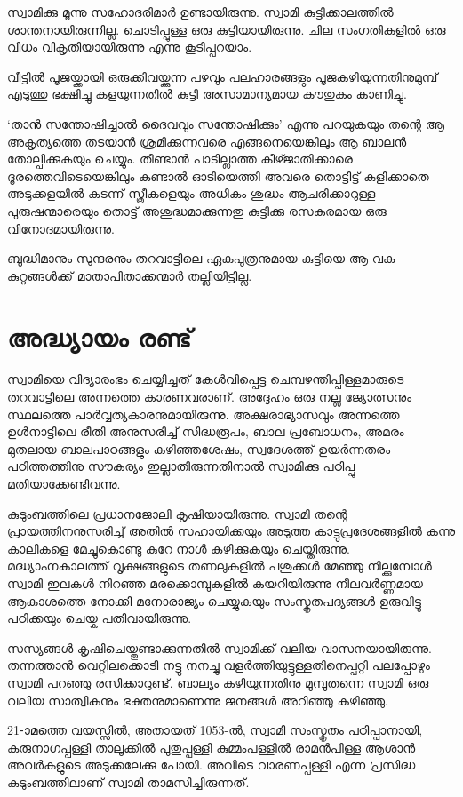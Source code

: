 \documentclass[12pt,openany]{book}
\begin{document}
	സ്വാമിക്കു മൂന്നു സഹോദരിമാർ ഉണ്ടായിരുന്നു. സ്വാമി കുട്ടിക്കാലത്തിൽ ശാന്തനായിരുന്നില്ല. ചൊടിപ്പുള്ള ഒരു കുട്ടിയായിരുന്നു. ചില സംഗതികളിൽ ഒരു വിധം വികൃതിയായിരുന്നു എന്നു കൂടിപ്പറയാം.
	
	വീട്ടിൽ പൂജയ്ക്കായി ഒരുക്കിവയ്ക്കുന്ന പഴവും പലഹാരങ്ങളും പൂജകഴിയുന്നതിനുമുമ്പ് എടുത്തു ഭക്ഷിച്ചു കളയുന്നതിൽ കുട്ടി അസാമാന്യമായ കൗതുകം കാണിച്ചു.
	
	`താൻ സന്തോഷിച്ചാൽ ദൈവവും സന്തോഷിക്കും' എന്നു പറയുകയും തന്റെ ആ അകൃത്യത്തെ തടയാൻ ശ്രമിക്കുന്നവരെ എങ്ങനെയെങ്കിലും ആ ബാലൻ തോല്പിക്കുകയും ചെയ്യും. തീണ്ടാൻ പാടില്ലാത്ത കീഴ്ജാതിക്കാരെ ദൂരത്തെവിടെയെങ്കിലും കണ്ടാൽ ഓടിയെത്തി അവരെ തൊട്ടിട്ട് കുളിക്കാതെ അടുക്കളയിൽ കടന്ന് സ്ത്രീകളെയും അധികം ശുദ്ധം ആചരിക്കാറുള്ള പുരുഷന്മാരെയും തൊട്ട് അശുദ്ധമാക്കുന്നതു കുട്ടിക്കു രസകരമായ ഒരു വിനോദമായിരുന്നു.
	
	ബുദ്ധിമാനും സുന്ദരനും തറവാട്ടിലെ ഏകപുത്രനുമായ കുട്ടിയെ ആ വക കുറ്റങ്ങൾക്ക് മാതാപിതാക്കന്മാർ തല്ലിയിട്ടില്ല.
	
	\newpage
	\chapter*{അദ്ധ്യായം രണ്ട്}
	
	സ്വാമിയെ വിദ്യാരംഭം ചെയ്യിച്ചത് കേൾവിപ്പെട്ട ചെമ്പഴന്തിപ്പിള്ളമാരുടെ തറവാട്ടിലെ അന്നത്തെ കാരണവരാണ്. അദ്ദേഹം ഒരു നല്ല ജ്യോത്സനും സ്ഥലത്തെ പാർവ്വത്യകാരനുമായിരുന്നു. അക്ഷരാഭ്യാസവും അന്നത്തെ ഉൾനാട്ടിലെ രീതി അനുസരിച്ച് സിദ്ധരൂപം, ബാല പ്രബോധനം, അമരം മുതലായ ബാലപാഠങ്ങളും കഴിഞ്ഞശേഷം, സ്വദേശത്ത് ഉയർന്നതരം പഠിത്തത്തിനു സൗകര്യം ഇല്ലാതിരുന്നതിനാൽ സ്വാമിക്കു പഠിപ്പു മതിയാക്കേണ്ടിവന്നു.
	
	കുടുംബത്തിലെ പ്രധാനജോലി കൃഷിയായിരുന്നു. സ്വാമി തന്റെ പ്രായത്തിനനുസരിച്ച് അതിൽ സഹായിക്കയും അടുത്ത കാട്ടുപ്രദേശങ്ങളിൽ കന്നു കാലികളെ മേച്ചുകൊണ്ടു കുറേ നാൾ കഴിക്കുകയും ചെയ്തിരുന്നു. മദ്ധ്യാഹ്നകാലത്ത് വൃക്ഷങ്ങളുടെ തണലുകളിൽ പശുക്കൾ മേഞ്ഞു നില്ക്കുമ്പോൾ സ്വാമി ഇലകൾ നിറഞ്ഞ മരക്കൊമ്പുകളിൽ കയറിയിരുന്നു നീലവർണ്ണമായ ആകാശത്തെ നോക്കി മനോരാജ്യം ചെയ്യുകയും സംസ്കൃതപദ്യങ്ങൾ ഉരുവിട്ടു പഠിക്കയും ചെയ്ക പതിവായിരുന്നു.
	
	സസ്യങ്ങൾ കൃഷിചെയ്തുണ്ടാക്കുന്നതിൽ സ്വാമിക്ക് വലിയ വാസനയായിരുന്നു. തന്നത്താൻ വെറ്റിലക്കൊടി നട്ടു നനച്ചു വളർത്തിയുട്ടുള്ളതിനെപ്പറ്റി പലപ്പോഴും സ്വാമി പറഞ്ഞു രസിക്കാറുണ്ട്. ബാല്യം കഴിയുന്നതിനു മുമ്പുതന്നെ സ്വാമി ഒരു വലിയ സാത്വികനും ഭക്തനുമാണെന്നു ജനങ്ങൾ അറിഞ്ഞു കഴിഞ്ഞു.
	
	21-ാമത്തെ വയസ്സിൽ, അതായത് 1053-ൽ, സ്വാമി സംസ്കൃതം പഠിപ്പാനായി, കരുനാഗപ്പള്ളി താലൂക്കിൽ പുതുപ്പള്ളി കുമ്മംപള്ളിൽ രാമൻപിള്ള ആശാൻ അവർകളുടെ അടുക്കലേക്കു പോയി. അവിടെ വാരണപ്പള്ളി എന്ന പ്രസിദ്ധ കുടുംബത്തിലാണ് സ്വാമി താമസിച്ചിരുന്നത്.
	
\end{document}
